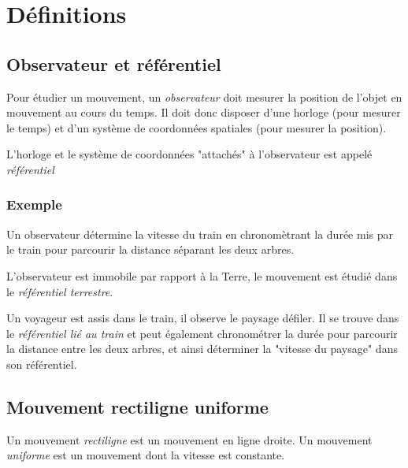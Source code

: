 

\section{Définitions}
  \subsection{Observateur et référentiel}

Pour étudier un mouvement, un {\it observateur} doit mesurer la position de l'objet en mouvement au cours du temps. Il doit donc disposer d'une horloge (pour mesurer le temps) et d'un système de coordonnées spatiales (pour mesurer la position).

L'horloge et le système de coordonnées "attachés" à l'observateur est appelé {\it référentiel}


    \subsubsection{Exemple}
Un observateur détermine la vitesse du train en chronomètrant la durée mis par le train pour parcourir la distance séparant les deux arbres.

\begin{center}
%

\end{center}

L'observateur est immobile par rapport à la Terre, le mouvement est étudié dans le {\it référentiel terrestre}.

Un voyageur est assis dans le train, il observe le paysage défiler. Il se trouve dans le {\it référentiel lié au train} et peut également chronométrer la durée pour parcourir la distance entre les deux arbres, et ainsi déterminer la "vitesse du paysage" dans son référentiel.


  \subsection{Mouvement rectiligne uniforme}

Un mouvement {\it rectiligne} est un mouvement en ligne droite. Un mouvement {\it uniforme} est un mouvement dont la vitesse est constante.




